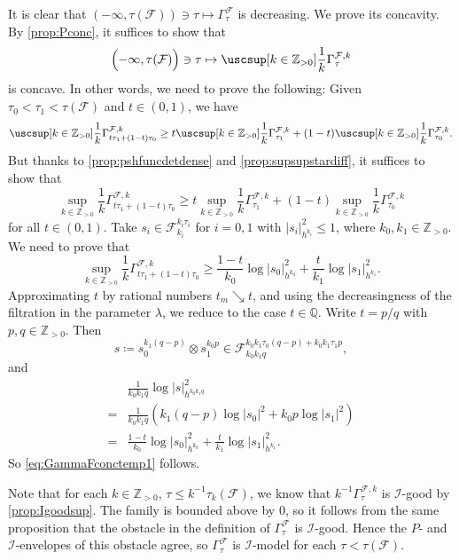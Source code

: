 \begin{example}
    It is clear that $(-\infty,\tau(\mathcal{F}))\ni \tau\mapsto \Gamma^{\mathcal{F}}_{\tau}$ is decreasing. We prove its concavity. By \cref{prop:Pconc}, it suffices to show that
    \[
    \Bigl(-\infty,\tau(\mathcal{F})\Bigr)\ni\tau\mapsto \uscsup[k\in \mathbb{Z}_{>0}] \frac{1}{k} \Gamma^{\mathcal{F},k}_{\tau}
    \]
    is concave. In other words, we need to prove the following: Given $\tau_0<\tau_1<\tau(\mathcal{F})$ and $t\in (0,1)$, we have
    \[
    \uscsup[k\in \mathbb{Z}_{>0}] \frac{1}{k} \Gamma^{\mathcal{F},k}_{t\tau_1+(1-t)\tau_0}\geq t\uscsup[k\in \mathbb{Z}_{>0}] \frac{1}{k} \Gamma^{\mathcal{F},k}_{\tau_1}+(1-t)\uscsup[k\in \mathbb{Z}_{>0}] \frac{1}{k} \Gamma^{\mathcal{F},k}_{\tau_0}.
    \]
    But thanks to \cref{prop:pshfuncdetdense} and \cref{prop:supsupstardiff}, it suffices to show that
    \[
    \sup_{k\in \mathbb{Z}_{>0}} \frac{1}{k}\Gamma^{\mathcal{F},k}_{t\tau_1+(1-t)\tau_0}\geq t\sup_{k\in \mathbb{Z}_{>0}} \frac{1}{k}\Gamma^{\mathcal{F},k}_{\tau_1}+(1-t)\sup_{k\in \mathbb{Z}_{>0}} \frac{1}{k}\Gamma^{\mathcal{F},k}_{\tau_0}
    \]
    for all $t\in (0,1)$.
    Take $s_i\in \mathcal{F}^{k_i\tau_i}_{k_i}$ for $i=0,1$ with $|s_i|_{h^{k_i}}^2\leq 1$, where $k_0,k_1\in \mathbb{Z}_{>0}$.
    We need to prove that
    \begin{equation}\label{eq:GammaFconctemp1}
    \sup_{k\in \mathbb{Z}_{>0}} \frac{1}{k}\Gamma^{\mathcal{F},k}_{t\tau_1+(1-t)\tau_0}\geq \frac{1-t}{k_0}\log |s_0|_{h^{k_0}}^2+\frac{t}{k_1}\log |s_1|_{h^{k_1}}^2.
    \end{equation}
    Approximating $t$ by rational numbers $t_m\searrow t$, and using the decreasingness of the filtration in the parameter $\lambda$, we reduce to the case $t\in\mathbb Q$. Write $t=p/q$ with $p,q\in \mathbb{Z}_{>0}$. Then
    \[
    s\coloneqq s_0^{k_1(q-p)}\otimes s_1^{k_0p}\in \mathcal{F}_{k_0k_1 q}^{k_0k_1\tau_0(q-p)+k_0k_1\tau_1 p},
    \]
    and
    \[
    \begin{aligned}
    &\frac{1}{k_0k_1 q} \log |s|_{h^{k_0k_1 q}}^2\\
    =&\frac{1}{k_0k_1 q}\left(k_1(q-p)\log |s_0|^2+ k_0p\log |s_1|^2\right)\\
    = &\frac{1-t}{k_0}\log |s_0|_{h^{k_0}}^2+\frac{t}{k_1}\log |s_1|_{h^{k_1}}^2.
    \end{aligned}
    \]
    So \eqref{eq:GammaFconctemp1} follows.

    Note that for each $k\in \mathbb{Z}_{>0}$, $\tau\leq k^{-1}\tau_k(\mathcal{F})$, we know that $k^{-1}\Gamma_{\tau}^{\mathcal{F},k}$ is $\mathcal{I}$-good by \cref{prop:Igoodsup}. The family is bounded above by $0$, so it follows from the same proposition that the obstacle in the definition of $\Gamma^{\mathcal{F}}_{\tau}$ is $\mathcal{I}$-good. Hence the $P$- and $\mathcal{I}$-envelopes of this obstacle agree, so $\Gamma^{\mathcal{F}}_{\tau}$ is $\mathcal{I}$-model for each $\tau<\tau(\mathcal{F})$.


\end{example}

